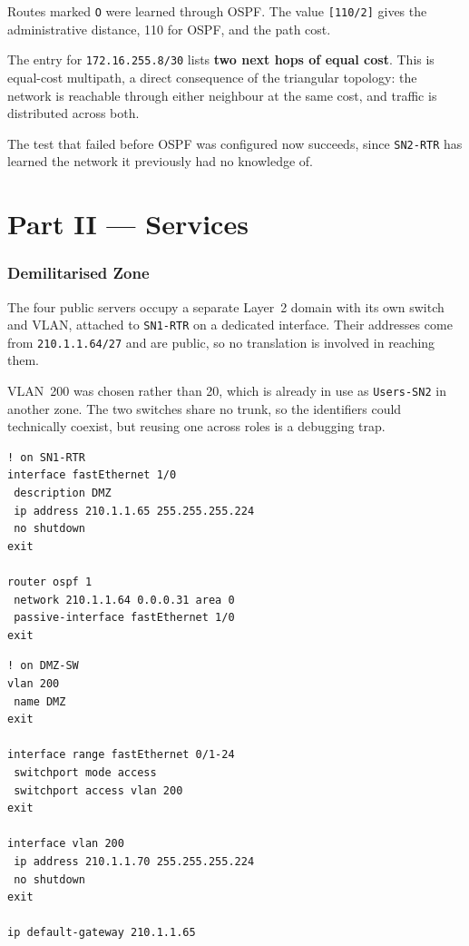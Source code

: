 \documentclass[12pt,a4paper]{article}
\begin{document}
Routes marked \texttt{O} were learned through OSPF. The value \texttt{[110/2]}
gives the administrative distance, 110 for OSPF, and the path cost.

The entry for \texttt{172.16.255.8/30} lists \textbf{two next hops of equal
cost}. This is equal-cost multipath, a direct consequence of the triangular
topology: the network is reachable through either neighbour at the same cost, and
traffic is distributed across both.

The test that failed before OSPF was configured now succeeds, since
\texttt{SN2-RTR} has learned the network it previously had no knowledge of.

\part*{Part II --- Services}

\section{Demilitarised Zone}

The four public servers occupy a separate Layer~2 domain with its own switch and
VLAN, attached to \texttt{SN1-RTR} on a dedicated interface. Their addresses come
from \texttt{210.1.1.64/27} and are public, so no translation is involved in
reaching them.

VLAN~200 was chosen rather than 20, which is already in use as \texttt{Users-SN2}
in another zone. The two switches share no trunk, so the identifiers could
technically coexist, but reusing one across roles is a debugging trap.

\begin{lstlisting}
! on SN1-RTR
interface fastEthernet 1/0
 description DMZ
 ip address 210.1.1.65 255.255.255.224
 no shutdown
exit

router ospf 1
 network 210.1.1.64 0.0.0.31 area 0
 passive-interface fastEthernet 1/0
exit
\end{lstlisting}

\begin{lstlisting}
! on DMZ-SW
vlan 200
 name DMZ
exit

interface range fastEthernet 0/1-24
 switchport mode access
 switchport access vlan 200
exit

interface vlan 200
 ip address 210.1.1.70 255.255.255.224
 no shutdown
exit

ip default-gateway 210.1.1.65
\end{lstlisting}
\end{document}
